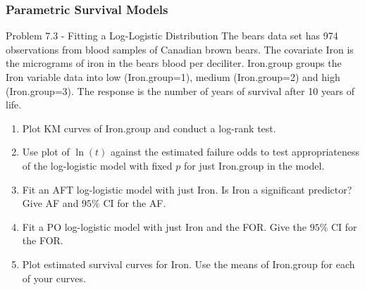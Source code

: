 \documentclass{beamer}
\theoremstyle{definition}
\begin{document}
\begin{frame}
\frametitle{Parametric Survival Models}
\begin{block}{Problem 7.3 - Fitting a Log-Logistic Distribution}
The bears data set has 974 observations from blood samples of Canadian brown bears. The covariate Iron is the micrograms of iron in the bears blood per deciliter. Iron.group groups the Iron variable data into low (Iron.group=1), medium (Iron.group=2) and high (Iron.group=3). The response is the number of years of survival after 10 years of life.
\begin{enumerate}
\item Plot KM curves of Iron.group and conduct a log-rank test.
\item Use plot of $\ln(t)$ against the estimated failure odds to test appropriateness of the log-logistic model with fixed $p$ for just Iron.group in the model.
\item Fit an AFT log-logistic model with just Iron. Is Iron a significant predictor? Give AF and $95\%$ CI for the AF.
\item Fit a PO log-logistic model with just Iron and the FOR. Give the $95\%$ CI for the FOR.
\item Plot estimated survival curves for Iron. Use the means of Iron.group for each of your curves.
\end{enumerate}
\end{block}
\end{frame}
\end{document}
